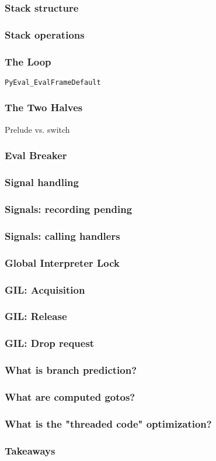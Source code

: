 \begin{frame}
\frametitle{Stack structure}
\end{frame}

\begin{frame}
\frametitle{Stack operations}
\end{frame}

\begin{frame}[fragile]
\frametitle{The Loop}
\verb|PyEval_EvalFrameDefault|
\end{frame}

\begin{frame}
\frametitle{The Two Halves}
Prelude vs. switch
\end{frame}

\begin{frame}
\frametitle{Eval Breaker}
\end{frame}

\begin{frame}
\frametitle{Signal handling}
\end{frame}

\begin{frame}
\frametitle{Signals: recording pending}
\end{frame}

\begin{frame}
\frametitle{Signals: calling handlers}
\end{frame}

\begin{frame}
\frametitle{Global Interpreter Lock}
\end{frame}

\begin{frame}
\frametitle{GIL: Acquisition}
\end{frame}

\begin{frame}
\frametitle{GIL: Release}
\end{frame}

\begin{frame}
\frametitle{GIL: Drop request}
\end{frame}

\begin{frame}
\frametitle{What is branch prediction?}
\end{frame}

\begin{frame}
\frametitle{What are computed gotos?}
\end{frame}

\begin{frame}
\frametitle{What is the "threaded code" optimization?}
\end{frame}

\begin{frame}
\frametitle{Takeaways}
\end{frame}


